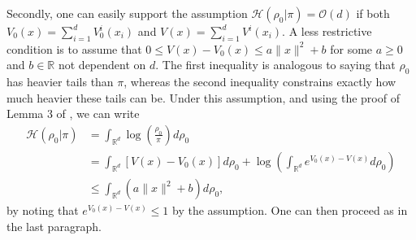 \documentclass[final,12pt]{colt2018}
\begin{document}
Secondly, one can easily support the assumption $\mathcal{H}(\rho_0 | \pi) = \mathcal{O}(d)$ if both $V_0(x) = \sum_{i=1}^d V_0^i(x_i)$ and $V(x) = \sum_{i=1}^d V^i(x_i)$. A less restrictive condition is to assume that $0\leq V(x) - V_0(x) \leq a\|x\|^2 +b$ for some $a\geq 0$ and $b\in\mathbb{R}$ not dependent on $d$. The first inequality is analogous to saying that $\rho_0$ has heavier tails than $\pi$, whereas the second inequality constrains exactly how much heavier these tails can be. Under this assumption, and using the proof of Lemma 3 of \citet{dalalyan2014theoretical}, we can write
\begin{align*}
\mathcal{H}(\rho_0 | \pi)  & =  \int_{\mathbb{R}^d}\log \left(\frac{\rho_0}{\pi}\right) d\rho_0\\
& = \int_{\mathbb{R}^d} \left[V(x) - V_0(x)\right]d\rho_0 + \log\left( \int_{\mathbb{R}^d} e^{V_0(x) - V(x)}d\rho_0\right) \\
& \leq \int_{\mathbb{R}^d} \left(a\|x\|^2 + b\right) d\rho_0,
\end{align*}
by noting that $e^{V_0(x) - V(x)}\leq 1$ by the assumption. One can then proceed as in the last paragraph.
\end{document}
